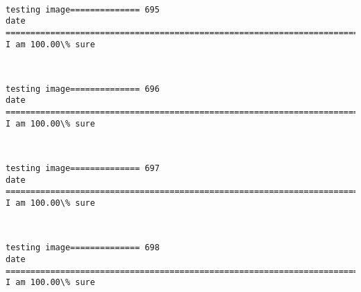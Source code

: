 \documentclass[11pt]{article}
\begin{document}
    \begin{center}
    \end{center}
    { \hspace*{\fill} \\}
    
    \begin{Verbatim}[commandchars=\\\{\}]
testing image============== 695
date
============================================================================
I am 100.00\% sure

    \end{Verbatim}

    \begin{center}
    \end{center}
    { \hspace*{\fill} \\}
    
    \begin{Verbatim}[commandchars=\\\{\}]
testing image============== 696
date
============================================================================
I am 100.00\% sure

    \end{Verbatim}

    \begin{center}
    \end{center}
    { \hspace*{\fill} \\}
    
    \begin{Verbatim}[commandchars=\\\{\}]
testing image============== 697
date
============================================================================
I am 100.00\% sure

    \end{Verbatim}

    \begin{center}
    \end{center}
    { \hspace*{\fill} \\}
    
    \begin{Verbatim}[commandchars=\\\{\}]
testing image============== 698
date
============================================================================
I am 100.00\% sure

    \end{Verbatim}
\end{document}
